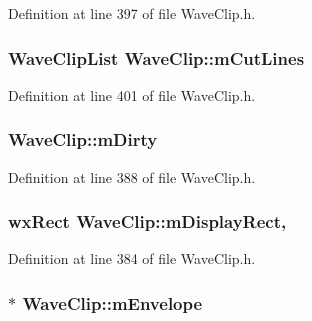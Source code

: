 Definition at line 397 of file Wave\+Clip.\+h.

\subsubsection[{\texorpdfstring{m\+Cut\+Lines}{mCutLines}}]{\setlength{\rightskip}{0pt plus 5cm}Wave\+Clip\+List Wave\+Clip\+::m\+Cut\+Lines\hspace{0.3cm}{\ttfamily [protected]}}\hypertarget{class_wave_clip_ae7ad94a38d669ca1a9ce06344a89c8e8}{}\label{class_wave_clip_ae7ad94a38d669ca1a9ce06344a89c8e8}


Definition at line 401 of file Wave\+Clip.\+h.

\subsubsection[{\texorpdfstring{m\+Dirty}{mDirty}}]{ Wave\+Clip\+::m\+Dirty\hspace{0.3cm}{\ttfamily [protected]}}\hypertarget{class_wave_clip_a0e1da41c713ec104dbb33886d2370643}{}\label{class_wave_clip_a0e1da41c713ec104dbb33886d2370643}


Definition at line 388 of file Wave\+Clip.\+h.

\subsubsection[{\texorpdfstring{m\+Display\+Rect}{mDisplayRect}}]{\setlength{\rightskip}{0pt plus 5cm}wx\+Rect Wave\+Clip\+::m\+Display\+Rect\hspace{0.3cm}{\ttfamily [mutable]}, {\ttfamily [protected]}}\hypertarget{class_wave_clip_a53b40f71993f40e4753bfd37a0cd9f9d}{}\label{class_wave_clip_a53b40f71993f40e4753bfd37a0cd9f9d}


Definition at line 384 of file Wave\+Clip.\+h.

\subsubsection[{\texorpdfstring{m\+Envelope}{mEnvelope}}]{$\ast$ Wave\+Clip\+::m\+Envelope\hspace{0.3cm}{\ttfamily [protected]}}\hypertarget{class_wave_clip_a3633c7bbd9fc7f3a9f7cc538b4904e1e}{}\label{class_wave_clip_a3633c7bbd9fc7f3a9f7cc538b4904e1e}



